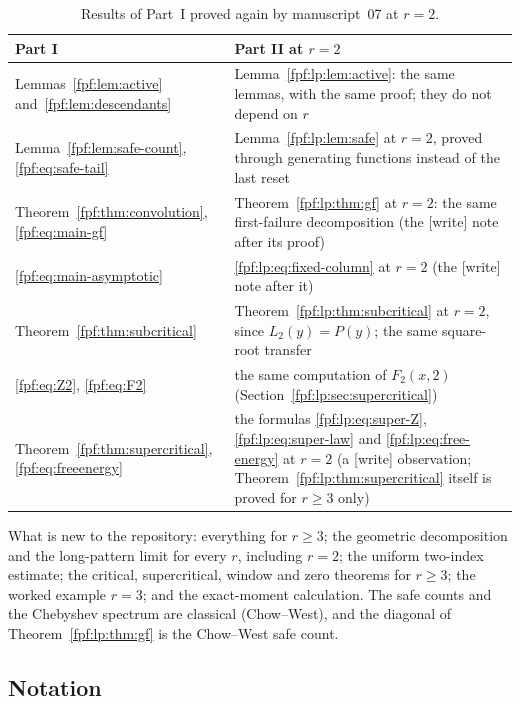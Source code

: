 \documentclass[11pt]{article}
\numberwithin{equation}{section}
\theoremstyle{definition}
\begin{document}
\begin{table}[htbp]
\centering\small
\renewcommand{\arraystretch}{1.12}
\begin{tabular}{@{}>{\raggedright\arraybackslash}p{}>{\raggedright\arraybackslash}p{}@{}}
\toprule
Part I & Part II at $r=2$\\
\midrule
Lemmas~\ref{fpf:lem:active} and~\ref{fpf:lem:descendants} &
Lemma~\ref{fpf:lp:lem:active}: the same lemmas, with the same proof; they do
not depend on $r$\\
Lemma~\ref{fpf:lem:safe-count}, \eqref{fpf:eq:safe-tail} &
Lemma~\ref{fpf:lp:lem:safe} at $r=2$, proved through generating functions
instead of the last reset\\
Theorem~\ref{fpf:thm:convolution}, \eqref{fpf:eq:main-gf} &
Theorem~\ref{fpf:lp:thm:gf} at $r=2$: the same first-failure decomposition
(the \textsf{[write]} note after its proof)\\
\eqref{fpf:eq:main-asymptotic} &
\eqref{fpf:lp:eq:fixed-column} at $r=2$ (the \textsf{[write]} note after it)\\
Theorem~\ref{fpf:thm:subcritical} &
Theorem~\ref{fpf:lp:thm:subcritical} at $r=2$, since $L_2(y)=P(y)$; the same
square-root transfer\\
\eqref{fpf:eq:Z2}, \eqref{fpf:eq:F2} &
the same computation of $F_2(x,2)$ (Section~\ref{fpf:lp:sec:supercritical})\\
Theorem~\ref{fpf:thm:supercritical}, \eqref{fpf:eq:freeenergy} &
the formulas \eqref{fpf:lp:eq:super-Z}, \eqref{fpf:lp:eq:super-law} and
\eqref{fpf:lp:eq:free-energy} at $r=2$ (a \textsf{[write]} observation;
Theorem~\ref{fpf:lp:thm:supercritical} itself is proved for $r\ge3$ only)\\
\bottomrule
\end{tabular}
\caption{Results of Part~I proved again by manuscript~07 at $r=2$.}
\label{fpf:lp:tab:routes}
\end{table}

What is new to the repository: everything for $r\ge3$; the geometric
decomposition and the long-pattern limit for every $r$, including $r=2$;
the uniform two-index estimate; the critical, supercritical, window and zero
theorems for $r\ge3$; the worked example $r=3$; and the exact-moment
calculation. The safe counts and the Chebyshev spectrum are classical
(Chow--West), and the diagonal of Theorem~\ref{fpf:lp:thm:gf} is the
Chow--West safe count.

\subsection{Notation}\label{fpf:lp:sec:notation}
\end{document}
